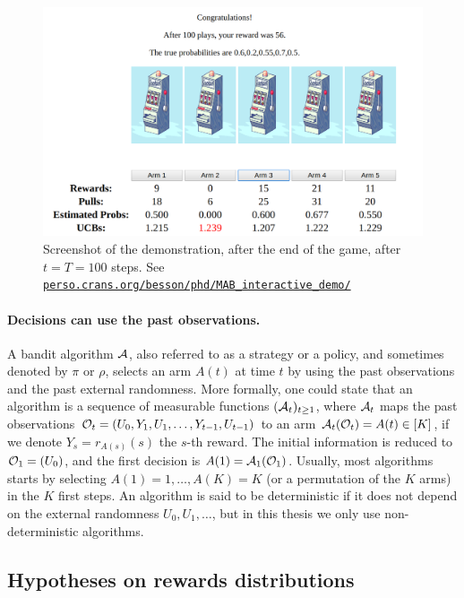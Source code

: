 \begin{figure}[h!]  %
    \centering
    \includegraphics[width=0.75\linewidth]{2-Chapters/2-Chapter/Images/example_of_a_5_arm_bandit_problem__step100.png}
    \caption{Screenshot of the demonstration, after the end of the game, after $t=T=100$ steps.  See \href{https://perso.crans.org/besson/phd/MAB\_interactive\_demo/}{\texttt{perso.crans.org/besson/phd/MAB\_interactive\_demo/}}}
    \label{fig:2:example_of_a_5_arm_bandit_problem__step100}
\end{figure}


\paragraph{Decisions can use the past observations.}

A bandit algorithm $\mathcal{A}$, also referred to as a strategy or a policy, and sometimes denoted by $\pi$ or $\rho$, selects an arm $A(t)$ at time $t$ by using the past observations and the past external randomness.
More formally, one could state that an algorithm is a sequence of measurable functions $(\mathcal{A}_t)_{t\geq1}$,
where $\mathcal{A}_t$ maps the past observations $\mathcal{O}_t = (U_0, Y_1, U_1, \dots, Y_{t-1}, U_{t-1})$
to an arm $\mathcal{A}_t(\mathcal{O}_t) = A(t) \in[K]$,
if we denote $Y_s = r_{A(s)}(s)$ the $s$-th reward.
The initial information is reduced to $\mathcal{O}_1 = (U_0)$, and the first decision is $A(1) = \mathcal{A}_1(\mathcal{O}_1)$. Usually, most algorithms starts by selecting $A(1)=1,\dots,A(K)=K$ (or a permutation of the $K$ arms) in the $K$ first steps.
%
An algorithm is said to be deterministic if it does not depend on the external randomness $U_0,U_1,\dots$, but in this thesis we only use non-deterministic algorithms.


\subsection{Hypotheses on rewards distributions}

